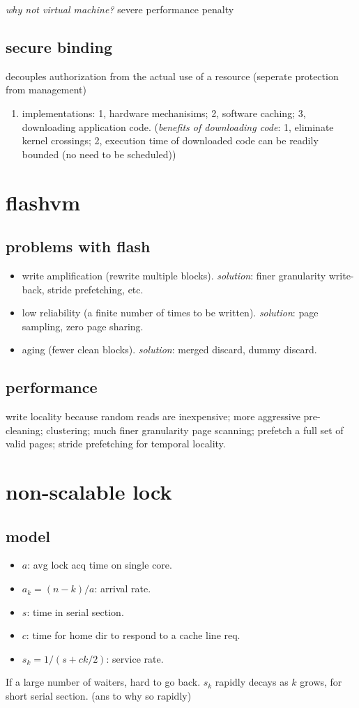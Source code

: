 \documentclass[9pt,conference]{IEEEtran}
\begin{document}
\emph{why not virtual machine?} severe performance penalty
\subsection{secure binding}
\label{sec-1-5}
decouples authorization from the actual use of a resource (seperate protection from management)
\begin{enumerate}
\item implementations:
\label{sec-1-5-1}
1, hardware mechanisims; 2, software caching; 3, downloading application code.
(\emph{benefits of downloading code}: 1, eliminate kernel crossings;
2, execution time of downloaded code can be readily bounded (no need to be scheduled))
\end{enumerate}

\section{flashvm}
\label{sec-2}
\subsection{problems with flash}
\label{sec-2-1}
\begin{itemize}
\item write amplification (rewrite multiple blocks). \emph{solution}: finer granularity write-back, stride prefetching, etc.
\item low reliability (a finite number of times to be written). \emph{solution}: page sampling, zero page sharing.
\item aging (fewer clean blocks). \emph{solution}: merged discard, dummy discard.
\end{itemize}

\subsection{performance}
\label{sec-2-2}
write locality because random reads are inexpensive;
more aggressive pre-cleaning; clustering;
much finer granularity page scanning;
prefetch a full set of valid pages;
stride prefetching for temporal locality.

\section{non-scalable lock}
\label{sec-3}
\subsection{model}
\label{sec-3-1}
\begin{itemize}
\item $a$: avg lock acq time on single core.
\item $a_k = (n - k) / a$: arrival rate.
\item $s$: time in serial section.
\item $c$: time for home dir to respond to a cache line req.
\item $s_k = 1 / (s + ck / 2)$: service rate.
\end{itemize}
If a large number of waiters, hard to go back.
$s_k$ rapidly decays as $k$ grows, for short serial section. (ans to why so rapidly)
\end{document}
